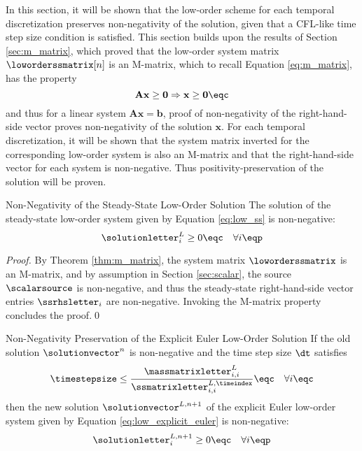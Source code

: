 In this section, it will be shown that the low-order scheme for each temporal
discretization preserves non-negativity of the solution, given that a
CFL-like time step size condition is satisfied. This section
builds upon the results of Section \ref{sec:m_matrix}, which proved that the
low-order system matrix $\loworderssmatrix[n]$ is an M-matrix, which to
recall Equation \eqref{eq:m_matrix}, has the property
\[
  \mathbf{A}\mathbf{x} \geq \mathbf{0} \Rightarrow \mathbf{x} \geq \mathbf{0} \eqc
\]
and thus for a linear system $\mathbf{A}\mathbf{x} = \mathbf{b}$,
proof of non-negativity of the right-hand-side vector proves non-negativity
of the solution $\mathbf{x}$. For each temporal discretization, it will be
shown that the system matrix inverted for the corresponding low-order system
is also an M-matrix and that the right-hand-side vector for each system is
non-negative. Thus positivity-preservation of the solution will be proven.
\begin{theorem}{Non-Negativity of the Steady-State Low-Order Solution}
  The solution of the steady-state low-order system given by Equation
  \eqref{eq:low_ss} is non-negative:
  \[
    \solutionletter^L_i \geq 0 \eqc \quad \forall i\eqp
  \]
\end{theorem}

\begin{proof}
By Theorem \ref{thm:m_matrix}, the system matrix $\loworderssmatrix$ is an
M-matrix, and by assumption in Section \ref{sec:scalar}, the source $\scalarsource$
is non-negative, and thus the steady-state right-hand-side vector entries
$\ssrhsletter_i$ are non-negative. Invoking the M-matrix property
concludes the proof.\qed
\end{proof}
\begin{theorem}{Non-Negativity Preservation of the Explicit Euler Low-Order Solution}
  If the old solution $\solutionvector^n$ is non-negative and
  the time step size $\dt$ satisfies
\begin{equation}\label{eq:explicit_cfl}
  \timestepsize \leq \frac{\massmatrixletter_{i,i}^{L}}
    {\ssmatrixletter_{i,i}^{L,\timeindex}}
  \eqc\quad\forall i \eqc
\end{equation}
  then the new solution $\solutionvector^{L,n+1}$ of the explicit Euler low-order
  system given by Equation \eqref{eq:low_explicit_euler} is non-negative:
  \[
    \solutionletter^{L,n+1}_i \geq 0 \eqc \quad \forall i\eqp
  \]
\end{theorem}

